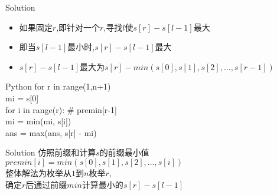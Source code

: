 \documentclass[aspectratio=169,xcolor=dvipsnames]{beamer}
\begin{document}
\begin{frame}{Solution}

    \begin{itemize}
        \item 如果固定$r$,即针对一个$r$,寻找$l$使$s[r]-s[l-1]$最大\\
        \item 即当$s[l-1]$最小时,$s[r]-s[l-1]$最大\\
        \item $s[r]-s[l-1]$最大为$s[r]-min(s[0],s[1],s[2],...,s[r-1])$
    \end{itemize}



    \begin{block}{Python}
        for r in range(1,n+1)\\
        \quad mi = s[0]\\
        \quad for i in range(r): \# premin[r-1]\\
        \quad \quad mi = min(mi, s[i])\\
        \quad ans = max(ans, s[r] - mi)
    \end{block}

\end{frame}

\begin{frame}{Solution}
    仿照前缀和计算$s$的前缀最小值 $premin[i]=min(s[0],s[1],s[2],...,s[i])$\\
    整体解法为枚举从$1$到$n$枚举$r$,\\
    确定$r$后通过前缀$min$计算最小的$s[r]-s[l-1]$
\end{frame}
\end{document}
